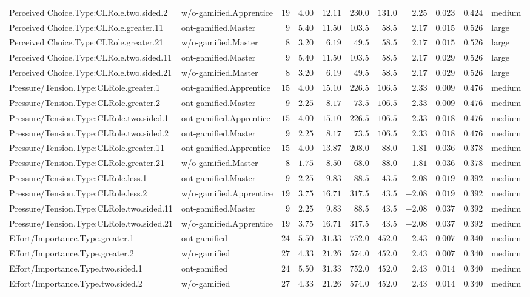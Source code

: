 \documentclass[6pt,a4paper]{article}
\begin{document}
\begin{landscape}
{\begin{longtable}{llrrrrrrrrl}
Perceived Choice.Type:CLRole.two.sided.2&w/o-gamified.Apprentice&$19$&$4.00$&$12.11$&$230.0$&$131.0$&$ 2.25$&$0.023$&$0.424$&medium\tabularnewline
Perceived Choice.Type:CLRole.greater.11&ont-gamified.Master&$ 9$&$5.40$&$11.50$&$103.5$&$ 58.5$&$ 2.17$&$0.015$&$0.526$&large\tabularnewline
Perceived Choice.Type:CLRole.greater.21&w/o-gamified.Master&$ 8$&$3.20$&$ 6.19$&$ 49.5$&$ 58.5$&$ 2.17$&$0.015$&$0.526$&large\tabularnewline
Perceived Choice.Type:CLRole.two.sided.11&ont-gamified.Master&$ 9$&$5.40$&$11.50$&$103.5$&$ 58.5$&$ 2.17$&$0.029$&$0.526$&large\tabularnewline
Perceived Choice.Type:CLRole.two.sided.21&w/o-gamified.Master&$ 8$&$3.20$&$ 6.19$&$ 49.5$&$ 58.5$&$ 2.17$&$0.029$&$0.526$&large\tabularnewline
Pressure/Tension.Type:CLRole.greater.1&ont-gamified.Apprentice&$15$&$4.00$&$15.10$&$226.5$&$106.5$&$ 2.33$&$0.009$&$0.476$&medium\tabularnewline
Pressure/Tension.Type:CLRole.greater.2&ont-gamified.Master&$ 9$&$2.25$&$ 8.17$&$ 73.5$&$106.5$&$ 2.33$&$0.009$&$0.476$&medium\tabularnewline
Pressure/Tension.Type:CLRole.two.sided.1&ont-gamified.Apprentice&$15$&$4.00$&$15.10$&$226.5$&$106.5$&$ 2.33$&$0.018$&$0.476$&medium\tabularnewline
Pressure/Tension.Type:CLRole.two.sided.2&ont-gamified.Master&$ 9$&$2.25$&$ 8.17$&$ 73.5$&$106.5$&$ 2.33$&$0.018$&$0.476$&medium\tabularnewline
Pressure/Tension.Type:CLRole.greater.11&ont-gamified.Apprentice&$15$&$4.00$&$13.87$&$208.0$&$ 88.0$&$ 1.81$&$0.036$&$0.378$&medium\tabularnewline
Pressure/Tension.Type:CLRole.greater.21&w/o-gamified.Master&$ 8$&$1.75$&$ 8.50$&$ 68.0$&$ 88.0$&$ 1.81$&$0.036$&$0.378$&medium\tabularnewline
Pressure/Tension.Type:CLRole.less.1&ont-gamified.Master&$ 9$&$2.25$&$ 9.83$&$ 88.5$&$ 43.5$&$-2.08$&$0.019$&$0.392$&medium\tabularnewline
Pressure/Tension.Type:CLRole.less.2&w/o-gamified.Apprentice&$19$&$3.75$&$16.71$&$317.5$&$ 43.5$&$-2.08$&$0.019$&$0.392$&medium\tabularnewline
Pressure/Tension.Type:CLRole.two.sided.11&ont-gamified.Master&$ 9$&$2.25$&$ 9.83$&$ 88.5$&$ 43.5$&$-2.08$&$0.037$&$0.392$&medium\tabularnewline
Pressure/Tension.Type:CLRole.two.sided.21&w/o-gamified.Apprentice&$19$&$3.75$&$16.71$&$317.5$&$ 43.5$&$-2.08$&$0.037$&$0.392$&medium\tabularnewline
Effort/Importance.Type.greater.1&ont-gamified&$24$&$5.50$&$31.33$&$752.0$&$452.0$&$ 2.43$&$0.007$&$0.340$&medium\tabularnewline
Effort/Importance.Type.greater.2&w/o-gamified&$27$&$4.33$&$21.26$&$574.0$&$452.0$&$ 2.43$&$0.007$&$0.340$&medium\tabularnewline
Effort/Importance.Type.two.sided.1&ont-gamified&$24$&$5.50$&$31.33$&$752.0$&$452.0$&$ 2.43$&$0.014$&$0.340$&medium\tabularnewline
Effort/Importance.Type.two.sided.2&w/o-gamified&$27$&$4.33$&$21.26$&$574.0$&$452.0$&$ 2.43$&$0.014$&$0.340$&medium\tabularnewline

\end{longtable}}
\end{landscape}
\end{document}
